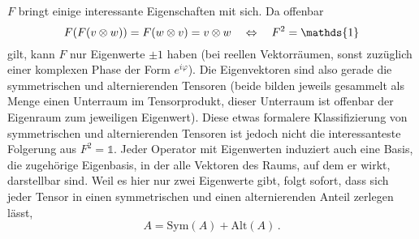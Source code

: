 \documentclass[../H_Analysis_main.tex]{subfiles}
\begin{document}
$F$ bringt einige interessante Eigenschaften mit sich. Da offenbar
\begin{equation}
F \qty(F(v \otimes w)) = F(w \otimes v) = v \otimes w \quad \Leftrightarrow \quad F^2 = \mathds{1}
\end{equation}
gilt, kann $F$ nur Eigenwerte $\pm 1$ haben (bei reellen Vektorräumen, sonst zuzüglich einer komplexen Phase der Form $e^{i \varphi}$). Die Eigenvektoren sind also gerade die symmetrischen und alternierenden Tensoren (beide bilden jeweils gesammelt als Menge einen Unterraum im Tensorprodukt, dieser Unterraum ist offenbar der Eigenraum zum jeweiligen Eigenwert). Diese etwas formalere Klassifizierung von symmetrischen und alternierenden Tensoren ist jedoch nicht die interessanteste Folgerung aus $F^2 = \mathds{1}$. Jeder Operator mit Eigenwerten induziert auch eine Basis, die zugehörige Eigenbasis, in der alle Vektoren des Raums, auf dem er wirkt, darstellbar sind. Weil es hier nur zwei Eigenwerte gibt, folgt sofort, dass sich jeder Tensor in einen symmetrischen und einen alternierenden Anteil zerlegen lässt,
\begin{equation}
A = \text{Sym}(A) + \text{Alt}(A) \, .
\end{equation}

\end{document}
